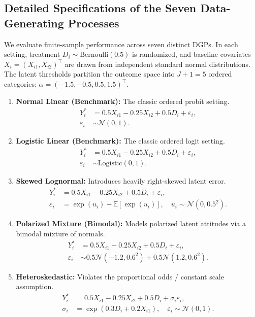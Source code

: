 \documentclass{article}
\numberwithin{figure}{section}
\numberwithin{table}{section}
\numberwithin{equation}{section}
\begin{document}
\subsection{Detailed Specifications of the Seven Data-Generating Processes}
We evaluate finite-sample performance across seven distinct DGPs. In each setting, treatment $D_i \sim \text{Bernoulli}(0.5)$ is randomized, and baseline covariates $X_i = (X_{i1}, X_{i2})^\top$ are drawn from independent standard normal distributions. The latent thresholds partition the outcome space into $J+1=5$ ordered categories: $\alpha = (-1.5, -0.5, 0.5, 1.5)^\top$.

\begin{enumerate}
    \item \textbf{Normal Linear (Benchmark):} The classic ordered probit setting.
    \begin{align*}
    Y_i^* &= 0.5 X_{i1} - 0.25 X_{i2} + 0.5 D_i + \varepsilon_i, \\
    \varepsilon_i &\sim \mathcal{N}(0, 1).
    \end{align*}
    
    \item \textbf{Logistic Linear (Benchmark):} The classic ordered logit setting.
    \begin{align*}
    Y_i^* &= 0.5 X_{i1} - 0.25 X_{i2} + 0.5 D_i + \varepsilon_i, \\
    \varepsilon_i &\sim \text{Logistic}(0, 1).
    \end{align*}
    
    \item \textbf{Skewed Lognormal:} Introduces heavily right-skewed latent error.
    \begin{align*}
    Y_i^* &= 0.5 X_{i1} - 0.25 X_{i2} + 0.5 D_i + \varepsilon_i, \\
    \varepsilon_i &= \exp(u_i) - \mathbb{E}[\exp(u_i)], \quad u_i \sim \mathcal{N}(0, 0.5^2).
    \end{align*}
    
    \item \textbf{Polarized Mixture (Bimodal):} Models polarized latent attitudes via a bimodal mixture of normals.
    \begin{align*}
    Y_i^* &= 0.5 X_{i1} - 0.25 X_{i2} + 0.5 D_i + \varepsilon_i, \\
    \varepsilon_i &\sim 0.5 \mathcal{N}(-1.2, 0.6^2) + 0.5 \mathcal{N}(1.2, 0.6^2).
    \end{align*}
    
    \item \textbf{Heteroskedastic:} Violates the proportional odds / constant scale assumption.
    \begin{align*}
    Y_i^* &= 0.5 X_{i1} - 0.25 X_{i2} + 0.5 D_i + \sigma_i \varepsilon_i, \\
    \sigma_i &= \exp(0.3 D_i + 0.2 X_{i1}), \quad \varepsilon_i \sim \mathcal{N}(0, 1).
    \end{align*}
    

\end{enumerate}
\end{document}
